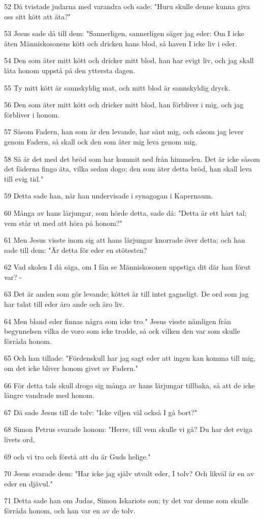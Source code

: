 \par 52 Då tvistade judarna med varandra och sade: "Huru skulle denne kunna giva oss sitt kött att äta?"
\par 53 Jesus sade då till dem: "Sannerligen, sannerligen säger jag eder: Om I icke äten Människosonens kött och dricken hans blod, så haven I icke liv i eder.
\par 54 Den som äter mitt kött och dricker mitt blod, han har evigt liv, och jag skall låta honom uppstå på den yttersta dagen.
\par 55 Ty mitt kött är sannskyldig mat, och mitt blod är sannskyldig dryck.
\par 56 Den som äter mitt kött och dricker mitt blod, han förbliver i mig, och jag förbliver i honom.
\par 57 Såsom Fadern, han som är den levande, har sänt mig, och såsom jag lever genom Fadern, så skall ock den som äter mig leva genom mig.
\par 58 Så är det med det bröd som har kommit ned från himmelen. Det är icke såsom det fäderna fingo äta, vilka sedan dogo; den som äter detta bröd, han skall leva till evig tid."
\par 59 Detta sade han, när han undervisade i synagogan i Kapernaum.
\par 60 Många av hans lärjungar, som hörde detta, sade då: "Detta är ett hårt tal; vem står ut med att höra på honom?"
\par 61 Men Jesus visste inom sig att hans lärjungar knorrade över detta; och han sade till dem: "Är detta för eder en stötesten?
\par 62 Vad skolen I då säga, om I fån se Människosonen uppstiga dit där han förut var? -
\par 63 Det är anden som gör levande; köttet är till intet gagneligt. De ord som jag har talat till eder äro ande och äro liv.
\par 64 Men bland eder finnas några som icke tro." Jesus visste nämligen från begynnelsen vilka de voro som icke trodde, så ock vilken den var som skulle förråda honom.
\par 65 Och han tillade: "Fördenskull har jag sagt eder att ingen kan komma till mig, om det icke bliver honom givet av Fadern."
\par 66 För detta tals skull drogo sig många av hans lärjungar tillbaka, så att de icke längre vandrade med honom.
\par 67 Då sade Jesus till de tolv: "Icke viljen väl också I gå bort?"
\par 68 Simon Petrus svarade honom: "Herre, till vem skulle vi gå? Du har det eviga livets ord,
\par 69 och vi tro och förstå att du är Guds helige."
\par 70 Jesus svarade dem: "Har icke jag själv utvalt eder, I tolv? Och likväl är en av eder en djävul."
\par 71 Detta sade han om Judas, Simon Iskariots son; ty det var denne som skulle förråda honom, och han var en av de tolv.


